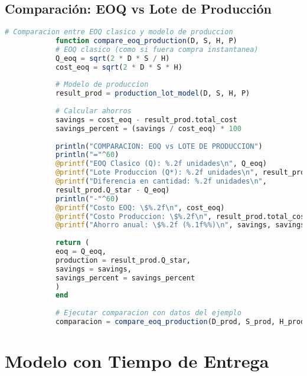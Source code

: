 \documentclass[12pt,a4paper]{book}
\begin{document}
	\subsection{Comparaci\'on: EOQ vs Lote de Producci\'on}
	
	\begin{tcolorbox}[enhanced,colback=azulclaro,colframe=azulprincipal,boxrule=2pt,arc=8pt,
		title={\bfseries\color{white} \faBalanceScale\ COMPARACI\'ON DE MODELOS}]
		
		\begin{lstlisting}[language=Julia,basicstyle=\footnotesize\ttfamily]
			# Comparacion entre EOQ clasico y modelo de produccion
			function compare_eoq_production(D, S, H, P)
			# EOQ clasico (como si fuera compra instantanea)
			Q_eoq = sqrt(2 * D * S / H)
			cost_eoq = sqrt(2 * D * S * H)
			
			# Modelo de produccion
			result_prod = production_lot_model(D, S, H, P)
			
			# Calcular ahorros
			savings = cost_eoq - result_prod.total_cost
			savings_percent = (savings / cost_eoq) * 100
			
			println("COMPARACION: EOQ vs LOTE DE PRODUCCION")
			println("="^60)
			@printf("EOQ Clasico (Q): %.2f unidades\n", Q_eoq)
			@printf("Lote Produccion (Q*): %.2f unidades\n", result_prod.Q_star)
			@printf("Diferencia en cantidad: %.2f unidades\n", 
			result_prod.Q_star - Q_eoq)
			println("-"^60)
			@printf("Costo EOQ: \$%.2f\n", cost_eoq)
			@printf("Costo Produccion: \$%.2f\n", result_prod.total_cost)
			@printf("Ahorro anual: \$%.2f (%.1f%%)\n", savings, savings_percent)
			
			return (
			eoq = Q_eoq,
			production = result_prod.Q_star,
			savings = savings,
			savings_percent = savings_percent
			)
			end
			
			# Ejecutar comparacion con datos del ejemplo
			comparacion = compare_eoq_production(D_prod, S_prod, H_prod, P_prod)
		\end{lstlisting}
		
	\end{tcolorbox}
	
	\section{Modelo con Tiempo de Entrega}
	
\end{document}
